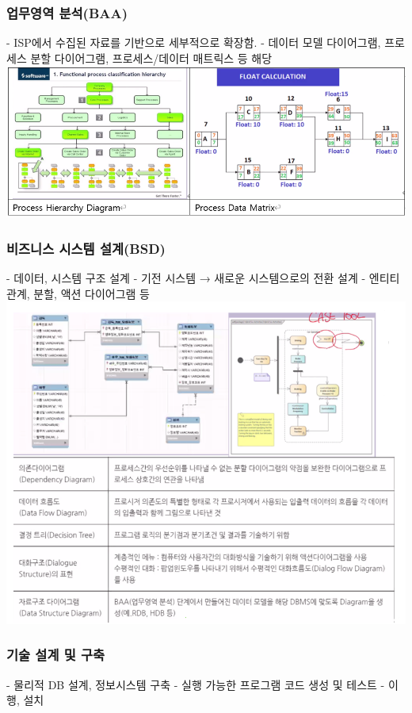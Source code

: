 \documentclass[a4paper,12pt]{article}
\begin{document}
\subsubsection{업무영역 분석(BAA)}
- ISP에서 수집된 자료를 기반으로 세부적으로 확장함.
\newline
- 데이터 모델 다이어그램, 프로세스 분할 다이어그램, 프로세스/데이터 매트릭스 등 해당
\newline
\includegraphics[scale=0.75]{23}

\subsubsection{비즈니스 시스템 설계(BSD)}
- 데이터, 시스템 구조 설계
\newline
- 기전 시스템 → 새로운 시스템으로의 전환 설계
\newline
- 엔티티 관계, 분할, 액션 다이어그램 등
\newline
\includegraphics[scale=0.8]{24}

\subsubsection{기술 설계 및 구축}
- 물리적 DB 설계, 정보시스템 구축
\newline
- 실행 가능한 프로그램 코드 생성 및 테스트
\newline
- 이행, 설치
\newline
\end{document}
